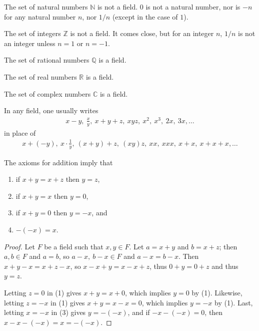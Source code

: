 \documentclass[12pt]{article}
\begin{document}
\begin{exm}
  The set of natural numbers $\mathbb{N}$ is not a field. $0$ is
  not a natural number, nor is $-n$ for any natural number $n$,
  nor $1/n$ (except in the case of $1$).
\end{exm}

\begin{exm}
  The set of integers $\mathbb{Z}$ is not a field. It comes
  close, but for an integer $n$, $1/n$ is not an integer unless
  $n = 1$ or $n = -1$.
\end{exm}

\begin{exm}
  The set of rational numbers $\mathbb{Q}$ is a field.
\end{exm}

\begin{exm}
  The set of real numbers $\mathbb{R}$ is a field.
\end{exm}

\begin{exm}
  The set of complex numbers $\mathbb{C}$ is a field.
\end{exm}

\begin{comm}
  In any field, one usually writes
  \begin{align*}
    x - y,\ \frac{x}{y},\ x + y + z,\ xyz,\ x^2,\ x^3,\ 2x,\ 3x,\ldots
  \end{align*}
  in place of
  \begin{align*}
    x + (-y),\ x \cdot \frac{1}{y},\ (x + y) + z,\ (xy)z,\ xx,\ xxx,\ x + x,\ x + x + x,\ldots
  \end{align*}
\end{comm}

\begin{thm} \label{thm:fieldaxforadd}
  The axioms for addition imply that
  \begin{enumerate}
    \item
      if $x + y = x + z$ then $y = z$,
    \item
      if $x + y = x$ then $y = 0$,
    \item
      if $x + y = 0 $ then $y = -x$, and
    \item
      $-(-x) = x$.
  \end{enumerate}

  \begin{proof}
    Let $F$ be a field such that $x,y \in F$. Let $a = x + y$ and $b = x + z$; then
    $a,b \in F$ and $a = b$, so $a-x,\ b-x \in F$ and $a - x = b - x$. Then $x + y -
    x = x + z - x$, so $x - x + y = x - x + z$, thus $0 + y = 0 + z$ and thus $y = z$.

    Letting $z = 0$ in (1) gives $x + y = x + 0$, which implies $y = 0$ by (1).
    Likewise, letting $z = -x$ in (1) gives $x + y = x - x = 0$, which implies $y =
    -x$ by (1). Last, letting $x = -x$ in (3) gives $y = -(-x)$, and if $-x - (-x) =
    0$, then $x - x - (-x) = x = -(-x)$.
  \end{proof}
\end{thm}
\end{document}
